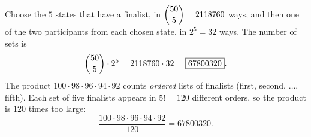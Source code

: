 Choose the $5$ states that have a finalist, in $\dbinom{50}{5}=2118760$ ways, and then one of the two participants from each chosen state, in $2^5=32$ ways. The number of sets is
\[
\dbinom{50}{5}\cdot2^5=2118760\cdot32=\boxed{67800320}.
\]
The product $100\cdot98\cdot96\cdot94\cdot92$ counts \emph{ordered} lists of finalists (first, second, $\dots$, fifth). Each set of five finalists appears in $5!=120$ different orders, so the product is $120$ times too large:
\[
\dfrac{100\cdot98\cdot96\cdot94\cdot92}{120}=67800320 .
\]
